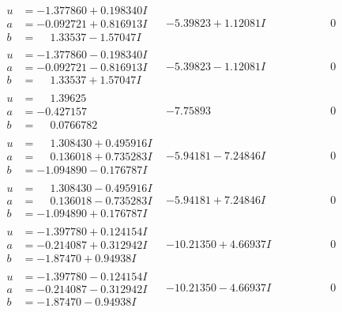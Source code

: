 \documentclass[1p]{elsarticle_modified}
\theoremstyle{definition}
\begin{document}
$$\begin{array}{c|c|c}
\begin{aligned}
u &= -1.377860 + 0.198340 I \\
a &= -0.092721 + 0.816913 I \\
b &= \phantom{-}1.33537 - 1.57047 I\end{aligned}
 & -5.39823 + 1.12081 I & \phantom{-0.000000 } 0 \\ \hline\begin{aligned}
u &= -1.377860 - 0.198340 I \\
a &= -0.092721 - 0.816913 I \\
b &= \phantom{-}1.33537 + 1.57047 I\end{aligned}
 & -5.39823 - 1.12081 I & \phantom{-0.000000 } 0 \\ \hline\begin{aligned}
u &= \phantom{-}1.39625\phantom{ +0.000000I} \\
a &= -0.427157\phantom{ +0.000000I} \\
b &= \phantom{-}0.0766782\phantom{ +0.000000I}\end{aligned}
 & -7.75893\phantom{ +0.000000I} & \phantom{-0.000000 } 0 \\ \hline\begin{aligned}
u &= \phantom{-}1.308430 + 0.495916 I \\
a &= \phantom{-}0.136018 + 0.735283 I \\
b &= -1.094890 - 0.176787 I\end{aligned}
 & -5.94181 - 7.24846 I & \phantom{-0.000000 } 0 \\ \hline\begin{aligned}
u &= \phantom{-}1.308430 - 0.495916 I \\
a &= \phantom{-}0.136018 - 0.735283 I \\
b &= -1.094890 + 0.176787 I\end{aligned}
 & -5.94181 + 7.24846 I & \phantom{-0.000000 } 0 \\ \hline\begin{aligned}
u &= -1.397780 + 0.124154 I \\
a &= -0.214087 + 0.312942 I \\
b &= -1.87470 + 0.94938 I\end{aligned}
 & -10.21350 + 4.66937 I & \phantom{-0.000000 } 0 \\ \hline\begin{aligned}
u &= -1.397780 - 0.124154 I \\
a &= -0.214087 - 0.312942 I \\
b &= -1.87470 - 0.94938 I\end{aligned}
 & -10.21350 - 4.66937 I & \phantom{-0.000000 } 0\\

\end{array}$$
\end{document}
